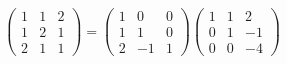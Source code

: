 \begin{enumerate}
{\begin{solution}
            \begin{align*}
                \begin{pmatrix}
                    1 & 1 & 2 \\
                    1 & 2 & 1 \\
                    2 & 1 & 1
                \end{pmatrix}
                = \begin{pmatrix}
                    1 & 0 & 0 \\
                    1 & 1 & 0 \\
                    2 & -1 & 1
                \end{pmatrix}
                \begin{pmatrix}
                    1 & 1 & 2 \\
                    0 & 1 & -1 \\
                    0 & 0 & -4
                \end{pmatrix}
            \end{align*}
        \end{solution}
    }{}


\end{enumerate}
